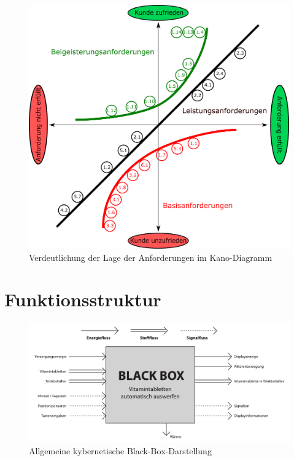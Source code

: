 \FloatBarrier
\begin{figure}[h!]
	\centering
	\includegraphics[width=\textwidth]{chapter/Bilder/kano} 
	\caption{Verdeutlichung der Lage der Anforderungen im Kano-Diagramm}
\end{figure}

\newpage
\section{Funktionsstruktur}

\begin{figure}[H]
	\centering
	\includegraphics[width=1.0\linewidth]{chapter/Bilder/funktionsstruktur_kybernetisch}
	\caption{Allgemeine kybernetische Black-Box-Darstellung}
	\label{fig:funktionsstrukturkybernetisch}
\end{figure}

